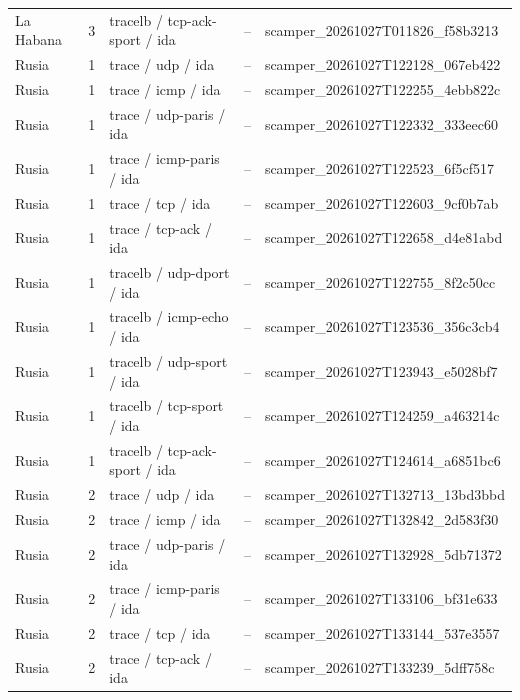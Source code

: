 \begin{longtable}{p{2cm}p{1.15cm}p{4.2cm}p{2.2cm}p{4.95cm}}
La Habana & 3 & tracelb / tcp-ack-sport / ida & -- & scamper\_\allowbreak{}20261027T011826\_\allowbreak{}f58b3213 \\
Rusia & 1 & trace / udp / ida & -- & scamper\_\allowbreak{}20261027T122128\_\allowbreak{}067eb422 \\
Rusia & 1 & trace / icmp / ida & -- & scamper\_\allowbreak{}20261027T122255\_\allowbreak{}4ebb822c \\
Rusia & 1 & trace / udp-paris / ida & -- & scamper\_\allowbreak{}20261027T122332\_\allowbreak{}333eec60 \\
Rusia & 1 & trace / icmp-paris / ida & -- & scamper\_\allowbreak{}20261027T122523\_\allowbreak{}6f5cf517 \\
Rusia & 1 & trace / tcp / ida & -- & scamper\_\allowbreak{}20261027T122603\_\allowbreak{}9cf0b7ab \\
Rusia & 1 & trace / tcp-ack / ida & -- & scamper\_\allowbreak{}20261027T122658\_\allowbreak{}d4e81abd \\
Rusia & 1 & tracelb / udp-dport / ida & -- & scamper\_\allowbreak{}20261027T122755\_\allowbreak{}8f2c50cc \\
Rusia & 1 & tracelb / icmp-echo / ida & -- & scamper\_\allowbreak{}20261027T123536\_\allowbreak{}356c3cb4 \\
Rusia & 1 & tracelb / udp-sport / ida & -- & scamper\_\allowbreak{}20261027T123943\_\allowbreak{}e5028bf7 \\
Rusia & 1 & tracelb / tcp-sport / ida & -- & scamper\_\allowbreak{}20261027T124259\_\allowbreak{}a463214c \\
Rusia & 1 & tracelb / tcp-ack-sport / ida & -- & scamper\_\allowbreak{}20261027T124614\_\allowbreak{}a6851bc6 \\
Rusia & 2 & trace / udp / ida & -- & scamper\_\allowbreak{}20261027T132713\_\allowbreak{}13bd3bbd \\
Rusia & 2 & trace / icmp / ida & -- & scamper\_\allowbreak{}20261027T132842\_\allowbreak{}2d583f30 \\
Rusia & 2 & trace / udp-paris / ida & -- & scamper\_\allowbreak{}20261027T132928\_\allowbreak{}5db71372 \\
Rusia & 2 & trace / icmp-paris / ida & -- & scamper\_\allowbreak{}20261027T133106\_\allowbreak{}bf31e633 \\
Rusia & 2 & trace / tcp / ida & -- & scamper\_\allowbreak{}20261027T133144\_\allowbreak{}537e3557 \\
Rusia & 2 & trace / tcp-ack / ida & -- & scamper\_\allowbreak{}20261027T133239\_\allowbreak{}5dff758c \\

\end{longtable}
